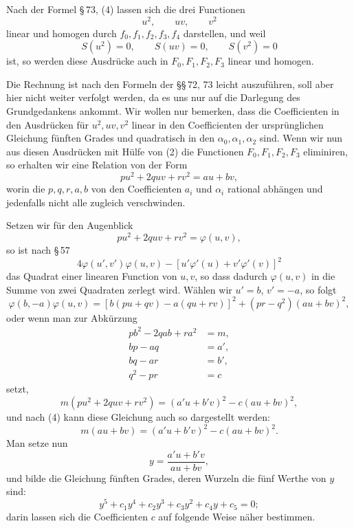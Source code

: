 \documentclass[11pt]{article}
\begin{document}
Nach der Formel \S\,73, (4) lassen sich die drei Functionen
\[
 u^2,\qquad uv,\qquad v^2
\]
linear und homogen durch $f_0,f_1,f_2,f_3,f_4$ darstellen, und weil
\begin{equation}
 S(u^2)=0,
 \qquad S(uv)=0,
 \qquad S(v^2)=0
\tag{3}
\end{equation}
ist, so werden diese Ausdrücke auch in $F_0,F_1,F_2,F_3$ linear und homogen.

Die Rechnung ist nach den Formeln der \S\S\,72, 73 leicht auszuführen, soll aber hier nicht weiter verfolgt werden, da es uns nur auf die Darlegung des Grundgedankens ankommt. Wir wollen nur bemerken, dass die Coefficienten in den Ausdrücken für $u^2,uv,v^2$ linear in den Coefficienten der ursprünglichen Gleichung fünften Grades und quadratisch in den $\alpha_0,\alpha_1,\alpha_2$ sind. Wenn wir nun aus diesen Ausdrücken mit Hülfe von (2) die Functionen $F_0,F_1,F_2,F_3$ eliminiren, so erhalten wir eine Relation von der Form
\begin{equation}
 pu^2+2quv+rv^2=au+bv,
\tag{4}
\end{equation}
worin die $p,q,r,a,b$ von den Coefficienten $a_i$ und $\alpha_i$ rational abhängen und jedenfalls nicht alle zugleich verschwinden.

Setzen wir für den Augenblick
\[
 pu^2+2quv+rv^2=\varphi(u,v),
\]
so ist nach \S\,57
\[
 4\varphi(u',v')\varphi(u,v)-[u'\varphi'(u)+v'\varphi'(v)]^2
\]
das Quadrat einer linearen Function von $u,v$, so dass dadurch $\varphi(u,v)$ in die Summe von zwei Quadraten zerlegt wird. Wählen wir $u'=b$, $v'=-a$, so folgt
\[
 \varphi(b,-a)\varphi(u,v)=[b(pu+qv)-a(qu+rv)]^2+(pr-q^2)(au+bv)^2,
\]
oder wenn man zur Abkürzung
\begin{equation}
\begin{aligned}
pb^2-2qab+ra^2&=m,\\
bp-aq&=a',\\
bq-ar&=b',\\
q^2-pr&=c
\end{aligned}
\tag{5}
\end{equation}
setzt,
\begin{equation}
 m(pu^2+2quv+rv^2)=(a'u+b'v)^2-c(au+bv)^2,
\tag{6}
\end{equation}
und nach (4) kann diese Gleichung auch so dargestellt werden:
\begin{equation}
 m(au+bv)=(a'u+b'v)^2-c(au+bv)^2.
\tag{7}
\end{equation}
Man setze nun
\begin{equation}
 y=\frac{a'u+b'v}{au+bv},
\tag{8}
\end{equation}
und bilde die Gleichung fünften Grades, deren Wurzeln die fünf Werthe von $y$ sind:
\begin{equation}
 y^5+c_1y^4+c_2y^3+c_3y^2+c_4y+c_5=0;
\tag{9}
\end{equation}
darin lassen sich die Coefficienten $c$ auf folgende Weise näher bestimmen.
\end{document}
